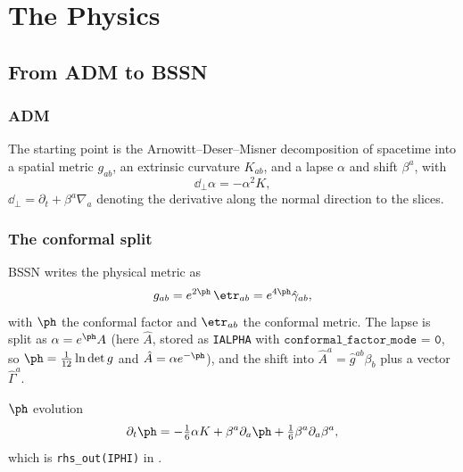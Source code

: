 \section{The Physics}
\label{ch:physics}

\subsection{From ADM to BSSN}

\subsubsection{ADM}

The starting point is the Arnowitt--Deser--Misner decomposition of spacetime
into a spatial metric $g_{ab}$, an extrinsic curvature $K_{ab}$, and a lapse
$\alpha$ and shift $\beta^a$, with
\begin{equation}
\label{eq:adm-lapse}
\dd_\perp \alpha = -\alpha^2 K,
\end{equation}
$\dd_\perp = \partial_t + \beta^a \nabla_a$ denoting the derivative along the
normal direction to the slices.

\subsubsection{The conformal split}

BSSN writes the physical metric as
\begin{equation}
\label{eq:conformal}
g_{ab} = e^{2\ph}\,\etr_{ab} = e^{4\ph}\hat{\gamma}_{ab},
\end{equation}
with $\ph$ the conformal factor and $\etr_{ab}$ the conformal metric. The
lapse is split as $\alpha = e^{\ph} A$ (here $\hat{A}$, stored as
\texttt{IALPHA} with $\texttt{conformal\_factor\_mode = 0}$, so $\ph =
\frac{1}{12}\ln\det g$ and $\hat{A} = \alpha e^{-\ph}$), and the shift into
$\hat{A}^a = \hat{g}^{ab}\beta_b$ plus a vector $\hat{\Gamma}^a$.

$\ph$ evolution
\begin{equation}
\label{eq:ph}
\partial_t\ph = -\tfrac{1}{6}\alpha K + \beta^a \partial_a\ph + \tfrac{1}{6}\beta^a\partial_a\beta^a,
\end{equation}
which is \texttt{rhs\_out(IPHI)} in .

